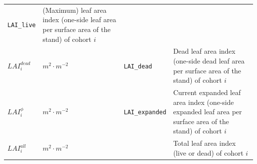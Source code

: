 \documentclass[]{book}
\begin{document}
\begin{longtable}[]{@{}llll@{}}
\begin{minipage}[t]{0.12\columnwidth}
\texttt{LAI\_live}\strut
\end{minipage} & \begin{minipage}[t]{0.45\columnwidth}\raggedright\strut
(Maximum) leaf area index (one-side leaf area per surface area of the
stand) of cohort \(i\)\strut
\end{minipage}\tabularnewline
\begin{minipage}[t]{0.11\columnwidth}\raggedright\strut
\(LAI^{dead}_i\)\strut
\end{minipage} & \begin{minipage}[t]{0.10\columnwidth}\raggedright\strut
\(m^2 \cdot m^{-2}\)\strut
\end{minipage} & \begin{minipage}[t]{0.12\columnwidth}\raggedright\strut
\texttt{LAI\_dead}\strut
\end{minipage} & \begin{minipage}[t]{0.45\columnwidth}\raggedright\strut
Dead leaf area index (one-side dead leaf area per surface area of the
stand) of cohort \(i\)\strut
\end{minipage}\tabularnewline
\begin{minipage}[t]{0.11\columnwidth}\raggedright\strut
\(LAI^{\phi}_i\)\strut
\end{minipage} & \begin{minipage}[t]{0.10\columnwidth}\raggedright\strut
\(m^2 \cdot m^{-2}\)\strut
\end{minipage} & \begin{minipage}[t]{0.12\columnwidth}\raggedright\strut
\texttt{LAI\_expanded}\strut
\end{minipage} & \begin{minipage}[t]{0.45\columnwidth}\raggedright\strut
Current expanded leaf area index (one-side expanded leaf area per
surface area of the stand) of cohort \(i\)\strut
\end{minipage}\tabularnewline
\begin{minipage}[t]{0.11\columnwidth}\raggedright\strut
\(LAI^{all}_{i}\)\strut
\end{minipage} & \begin{minipage}[t]{0.10\columnwidth}\raggedright\strut
\(m^2 \cdot m^{-2}\)\strut
\end{minipage} & \begin{minipage}[t]{0.12\columnwidth}\raggedright\strut
\strut
\end{minipage} & \begin{minipage}[t]{0.45\columnwidth}\raggedright\strut
Total leaf area index (live or dead) of cohort \(i\)\strut

\end{minipage}
\end{longtable}
\end{document}
